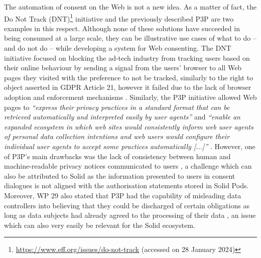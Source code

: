 The automation of consent on the Web is not a new idea.
As a matter of fact, the Do Not Track (DNT)\footnote{\url{https://www.eff.org/issues/do-not-track} (accessed on 28 January 2024)} initiative and the previously described P3P are two examples in this respect.
Although none of these solutions have succeeded in being consumed at a large scale, they can be illustrative use cases of what to do -- and do not do -- while developing a system for Web consenting. 
The DNT initiative focused on blocking the ad-tech industry from tracking users based on their online behaviour by sending a signal from the users' browser to all Web pages they visited with the preference to not be tracked, similarly to the right to object asserted in GDPR Article 21, however it failed due to the lack of browser adoption and enforcement mechanisms \citep{kamara_not_2016}.
Similarly, the P3P initiative allowed Web pages to \textit{``express their privacy practices in a standard format that can be retrieved automatically and interpreted easily by user agents''} and \textit{``enable an expanded ecosystem in which web sites would consistently inform web user agents of personal data collection intentions and web users would configure their individual user agents to accept some practices automatically [...]''} \citep{cranor_platform_2002}.
However, one of P3P's main drawbacks was the lack of consistency between human and machine-readable privacy notices communicated to users \citep{cranor_web_2002}, a challenge which can also be attributed to Solid as the information presented to users in consent dialogues is not aligned with the authorisation statements stored in Solid Pods.
Moreover, WP 29 also stated that P3P had the capability of misleading data controllers into believing that they could be discharged of certain obligations as long as data subjects had already agreed to the processing of their data \citep{article_29_data_protection_working_party_article_2014}, an issue which can also very easily be relevant for the Solid ecosystem.

